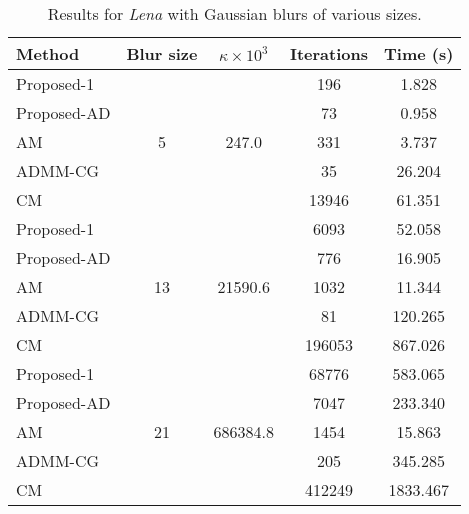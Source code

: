 \documentclass[10pt,twocolumn,twoside]{IEEEtran}
\begin{document}
\begin{table}[h]
	\renewcommand{\arraystretch}{1}
	\caption{Results for \textit{Lena} with Gaussian blurs of various sizes.}
	\centering
\begin{tabular}{l|c|c|c|c}
Method &Blur size &$\kappa \times 10^3$ &Iterations &Time (s) \\
\hline
Proposed-1 & \multirow{5}{*}{5} & \multirow{5}{*}{247.0} &  196 & 1.828  \\ 
Proposed-AD & & &   73 & 0.958 \\ 
AM & & &  331 & 3.737 \\ 
ADMM-CG & & &   35 & 26.204 \\ 
CM & & & 13946 & 61.351 \\ 
\hline 
Proposed-1 & \multirow{5}{*}{13} & \multirow{5}{*}{21590.6} & 6093 & 52.058  \\ 
Proposed-AD & & &  776 & 16.905 \\ 
AM & & & 1032 & 11.344 \\ 
ADMM-CG & & &   81 & 120.265 \\ 
CM & & & 196053 & 867.026 \\ 
\hline 
Proposed-1 & \multirow{5}{*}{21} & \multirow{5}{*}{686384.8} & 68776 & 583.065  \\ 
Proposed-AD & & & 7047 & 233.340 \\ 
AM & & & 1454 & 15.863 \\ 
ADMM-CG & & &  205 & 345.285 \\ 
CM & & & 412249 & 1833.467 \\ 
\hline 
\end{tabular}
\end{table}





\ifCLASSOPTIONcaptionsoff
  \newpage
\fi
\end{document}
